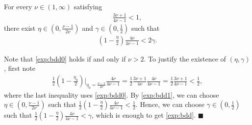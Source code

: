 \documentclass[12pt, twoside]{article}
\numberwithin{figure}{section}
\newcommand{\1}{\mathds 1}
\newcommand{\2}{{\mathbf 1}}
\renewenvironment{proof}[1][\proofname]{\noindent {\bfseries #1.}\;}{\hfill\ensuremath{\blacksquare}\\}
\begin{document}
\begin{lem}\label{lem:choicenu}
For every $\nu\in (1,\infty)$ satisfying
\begin{align}\label{exp:bdd0}
\frac{3\nu+1}{4\nu -1}<1,
\end{align}
there exist $\eta\in \left(0,\frac{\nu-1}{2\nu}\right)$ and $\gamma\in (0,\frac{1}{2})$ such that 
\begin{align}\label{exp:bdd}
\left(1-\frac{\eta}{2}\right)\frac{4\nu}{4\nu-1}<2\gamma .
\end{align}
\end{lem}
\begin{proof}
Note that \eqref{exp:bdd0} holds if and only if $\nu>2$. To justify the existence of $(\eta,\gamma)$, first note 
\begin{align}
\frac{1}{2}\left(1-\frac{\eta_0}{2}\right)\Big|_{\eta_0=\frac{\nu-1}{2\nu}}\frac{4\nu}{4\nu-1}=\frac{1}{2}\frac{3\nu+1}{4\nu}\frac{4\nu}{4\nu-1}=\frac{1}{2}\frac{3\nu+1}{4\nu-1}<\frac{1}{2},\label{exp:bdd1}
\end{align}
where the last inequality uses \eqref{exp:bdd0}. By \eqref{exp:bdd1}, we can choose $\eta\in \left(0,\frac{\nu-1}{2\nu}\right)$ such that 
$\frac{1}{2}\left(1-\frac{\eta}{2}\right)\frac{4\nu}{4\nu-1}<\frac{1}{2}$. Hence, we can choose $\gamma\in (0,\frac{1}{2})$ such that 
$\frac{1}{2}\left(1-\frac{\eta}{2}\right)\frac{4\nu}{4\nu-1}<\gamma$, which is enough to get \eqref{exp:bdd}.
\end{proof}
\end{document}

